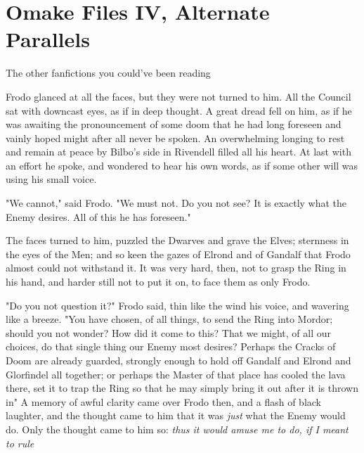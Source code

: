 \chapter{Omake Files IV, Alternate Parallels}

\begin{center}
    \small
    {The other fanfictions you could've been reading}
\end{center}
\vspace{7mm}



\noindent{}Frodo glanced at all the faces, but they were not turned to him. All the
Council sat with downcast eyes, as if in deep thought. A great dread fell on
him, as if he was awaiting the pronouncement of some doom that he had long
foreseen and vainly hoped might after all never be spoken. An overwhelming
longing to rest and remain at peace by Bilbo's side in Rivendell filled all his
heart. At last with an effort he spoke, and wondered to hear his own words, as
if some other will was using his small voice.

"We cannot," said Frodo. "We must not. Do you not see? It is exactly what the
Enemy desires. All of this he has foreseen."

The faces turned to him, puzzled the Dwarves and grave the Elves; sternness in
the eyes of the Men; and so keen the gazes of Elrond and of Gandalf that Frodo
almost could not withstand it. It was very hard, then, not to grasp the Ring in
his hand, and harder still not to put it on, to face them as only Frodo.

"Do you not question it?" Frodo said, thin like the wind his voice, and
wavering like a breeze. "You have chosen, of all things, to send the Ring into
Mordor; should you not wonder? How did it come to this? That we might, of all
our choices, do that single thing our Enemy most desires? Perhaps the Cracks of
Doom are already guarded, strongly enough to hold off Gandalf and Elrond and
Glorfindel all together; or perhaps the Master of that place has cooled the
lava there, set it to trap the Ring so that he may simply bring it out after it
is thrown in{\el}" A memory of awful clarity came over Frodo then, and a
flash of black laughter, and the thought came to him that it was \emph{just}
what the Enemy would do. Only the thought came to him so: \emph{thus it would
amuse me to do, if I meant to rule{\el}}

